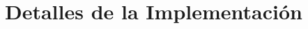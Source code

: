 \documentclass[oneside]{book}
\theoremstyle{definition}
\theoremstyle{example}
\begin{document}
%
%
%
%
%
%
%







\chapter{Detalles de la Implementación}
\end{document}
